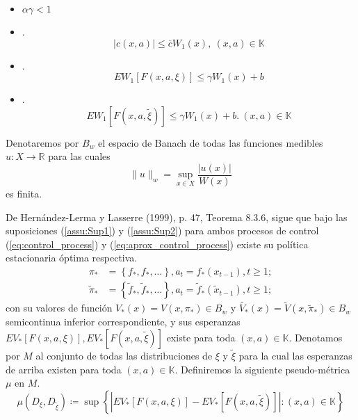 \documentclass[11pt, spanish]{amsart}
\begin{document}
\begin{itemize}
\item $\alpha\gamma<1$
\item .
\begin{equation}
\left|c\left(x,a\right)\right|\leq\overline{c}W_{1}\left(x\right),\ (x,a)\in\mathbb{K}\label{eq:w_1_c_bounded}
\end{equation}
\item .
\begin{equation}
EW_{1}\left[F\left(x,a,\xi\right)\right]\leq\gamma W_{1}\left(x\right)+b\label{eq:Lyapu1}
\end{equation}
\item .
\begin{equation}
EW_{1}\left[F\left(x,a,\widetilde{\xi}\right)\right]\leq\gamma W_{1}\left(x\right)+b.\ \left(x,a\right)\in\mathbb{K}\label{eq:Lyapu2}
\end{equation}
\end{itemize}
%
Denotaremos por $B_{w}$ el espacio de Banach de todas las funciones
medibles $u:X\to\mathbb{R}$ para las cuales 
\[
\|u\|_{w}=\sup_{x\in X}\dfrac{\left|u\left(x\right)\right|}{W\left(x\right)}
\]
 es finita. 

De Hernández-Lerma y Lasserre (1999), p. 47, Teorema 8.3.6, sigue
que bajo las suposiciones (\ref{assu:Sup1}) y (\ref{assu:Sup2})
para ambos procesos de control (\ref{eq:control_process}) y (\ref{eq:aprox_control_process})
existe su política estacionaria óptima respectiva. 
\begin{align*}
\pi_{*} & =\left\{ f_{*},f_{*},\ldots\right\} ,a_{t}=f_{*}\left(x_{t-1}\right),t\geq1;\\
\widetilde{\pi}_{*} & =\left\{ \widetilde{f}_{*},\widetilde{f}_{*},\ldots\right\} ,a_{t}=\widetilde{f}_{*}(\widetilde{x}_{t-1}),t\ge1;
\end{align*}
con su valores de función $V_{*}\left(x\right)=V\left(x,\pi_{*}\right)\in B_{w}$
y $\widetilde{V_{*}}\left(x\right)=\tilde{V}\left(x,\widetilde{\pi}_{*}\right)\in B_{w}$
semicontinua inferior correspondiente, y sus esperanzas $EV_{*}\left[F\left(x,a,\xi\right)\right],EV_{*}\left[F\left(x,a,\widetilde{\xi}\right)\right]$
existe para toda $\left(x,a\right)\in\mathbb{K}$. Denotamos por $M$
al conjunto de todas las distribuciones de $\xi$ y $\widetilde{\xi}$
para la cual las esperanzas de arriba existen para toda $\left(x,a\right)\in\mathbb{K}$.
Definiremos la siguiente pseudo-métrica $\mu$ en $M$. 
\begin{equation}
\mu\left(D_{\xi},D_{\widetilde{\xi}}\right)\coloneqq\sup\left\{ \left|EV_{*}\left[F\left(x,a,\xi\right)\right]-EV_{*}\left[F\left(x,a,\widetilde{\xi}\right)\right]\right|:\left(x,a\right)\in\mathbb{K}\right\} \label{eq:pseudo-metric}
\end{equation}
\end{document}

